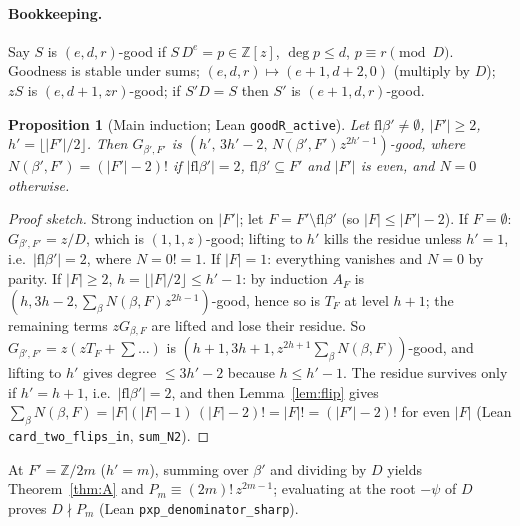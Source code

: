 \documentclass[10pt,a4paper]{article}
\newtheorem{proposition}[theorem]{Proposition}
\theoremstyle{remark}\newtheorem{remark}[theorem]{Remark}
\begin{document}
\paragraph{Bookkeeping.} Say $S$ is $(e,d,r)$-good if $S\,D^e=p\in\mathbb Z[z]$, $\deg p\le d$, $p\equiv r\pmod D$. Goodness is stable under sums; $(e,d,r)\mapsto(e{+}1,d{+}2,0)$ (multiply by $D$); $zS$ is $(e,d{+}1,zr)$-good; if $S'D=S$ then $S'$ is $(e{+}1,d,r)$-good.

\begin{proposition}[Main induction; Lean \texttt{goodR\_active}]
Let $\mathrm{fl}\beta'\ne\emptyset$, $|F'|\ge2$, $h'=\lfloor|F'|/2\rfloor$. Then $G_{\beta',F'}$ is $(h',\,3h'-2,\,N(\beta',F')z^{2h'-1})$-good, where $N(\beta',F')=(|F'|-2)!$ if $|\mathrm{fl}\beta'|=2$, $\mathrm{fl}\beta'\subseteq F'$ and $|F'|$ is even, and $N=0$ otherwise.
\end{proposition}
\begin{proof}[Proof sketch]
Strong induction on $|F'|$; let $F=F'\setminus\mathrm{fl}\beta'$ (so $|F|\le|F'|-2$). If $F=\emptyset$: $G_{\beta',F'}=z/D$, which is $(1,1,z)$-good; lifting to $h'$ kills the residue unless $h'=1$, i.e.\ $|\mathrm{fl}\beta'|=2$, where $N=0!=1$. If $|F|=1$: everything vanishes and $N=0$ by parity. If $|F|\ge2$, $h=\lfloor|F|/2\rfloor\le h'-1$: by induction $A_F$ is $(h,3h-2,\sum_\beta N(\beta,F)z^{2h-1})$-good, hence so is $T_F$ at level $h{+}1$; the remaining terms $zG_{\beta,F}$ are lifted and lose their residue. So $G_{\beta',F'}=z(zT_F+\sum\dots)$ is $(h{+}1,3h{+}1,z^{2h+1}\sum_\beta N(\beta,F))$-good, and lifting to $h'$ gives degree $\le 3h'-2$ because $h\le h'-1$. The residue survives only if $h'=h+1$, i.e.\ $|\mathrm{fl}\beta'|=2$, and then Lemma~\ref{lem:flip} gives $\sum_\beta N(\beta,F)=|F|(|F|-1)\,(|F|-2)!=|F|!=(|F'|-2)!$ for even $|F|$ (Lean \texttt{card\_two\_flips\_in}, \texttt{sum\_N2}).
\end{proof}
At $F'=\mathbb Z/2m$ ($h'=m$), summing over $\beta'$ and dividing by $D$ yields Theorem~\ref{thm:A} and $P_m\equiv(2m)!\,z^{2m-1}$; evaluating at the root $-\psi$ of $D$ proves $D\nmid P_m$ (Lean \texttt{pxp\_denominator\_sharp}).
\end{document}
